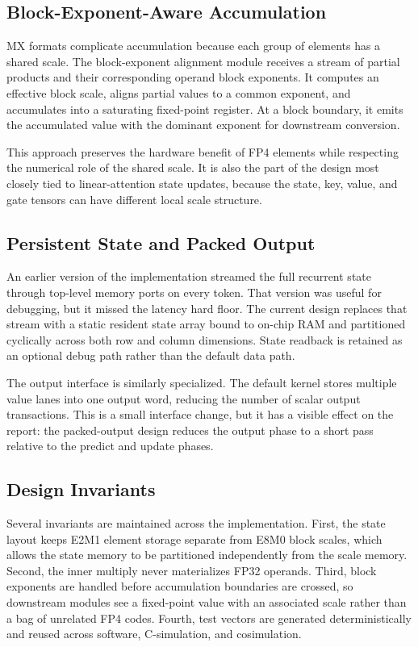\documentclass[conference]{IEEEtran}
\begin{document}
\subsection{Block-Exponent-Aware Accumulation}

MX formats complicate accumulation because each group of elements has a shared
scale. The block-exponent alignment module receives a stream of partial products
and their corresponding operand block exponents. It computes an effective block
scale, aligns partial values to a common exponent, and accumulates into a
saturating fixed-point register. At a block boundary, it emits the accumulated
value with the dominant exponent for downstream conversion.

This approach preserves the hardware benefit of FP4 elements while respecting
the numerical role of the shared scale. It is also the part of the design most
closely tied to linear-attention state updates, because the state, key, value,
and gate tensors can have different local scale structure.

\subsection{Persistent State and Packed Output}

An earlier version of the implementation streamed the full recurrent state
through top-level memory ports on every token. That version was useful for
debugging, but it missed the latency hard floor. The current design replaces
that stream with a static resident state array bound to on-chip RAM and
partitioned cyclically across both row and column dimensions. State readback is
retained as an optional debug path rather than the default data path.

The output interface is similarly specialized. The default kernel stores
multiple value lanes into one output word, reducing the number of scalar output
transactions. This is a small interface change, but it has a visible effect on
the report: the packed-output design reduces the output phase to a short pass
relative to the predict and update phases.

\subsection{Design Invariants}

Several invariants are maintained across the implementation. First, the state
layout keeps E2M1 element storage separate from E8M0 block scales, which allows
the state memory to be partitioned independently from the scale memory. Second,
the inner multiply never materializes FP32 operands. Third, block exponents are
handled before accumulation boundaries are crossed, so downstream modules see a
fixed-point value with an associated scale rather than a bag of unrelated FP4
codes. Fourth, test vectors are generated deterministically and reused across
software, C-simulation, and cosimulation.
\end{document}
